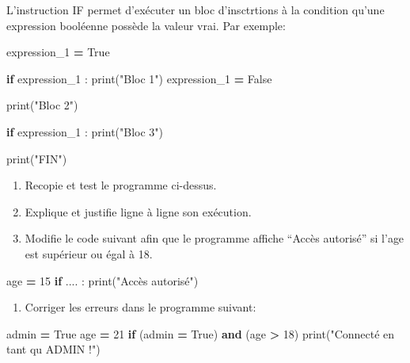 \documentclass[
]{book}
\newenvironment{Shaded}{\begin{snugshade}}{\end{snugshade}}
\newcommand{\BuiltInTok}[1]{#1}
\newcommand{\ControlFlowTok}[1]{\textcolor[rgb]{0.13,0.29,0.53}{\textbf{#1}}}
\newcommand{\DecValTok}[1]{\textcolor[rgb]{0.00,0.00,0.81}{#1}}
\newcommand{\KeywordTok}[1]{\textcolor[rgb]{0.13,0.29,0.53}{\textbf{#1}}}
\newcommand{\NormalTok}[1]{#1}
\newcommand{\OperatorTok}[1]{\textcolor[rgb]{0.81,0.36,0.00}{\textbf{#1}}}
\newcommand{\StringTok}[1]{\textcolor[rgb]{0.31,0.60,0.02}{#1}}
\newcommand{\VariableTok}[1]{\textcolor[rgb]{0.00,0.00,0.00}{#1}}
\providecommand{\tightlist}{%
  \setlength{\itemsep}{0pt}\setlength{\parskip}{0pt}}
\def\tightlist{}
\begin{document}
L'instruction IF permet d'exécuter un bloc d'insctrtions à la condition qu'une expression booléenne possède la valeur vrai. Par exemple:

\begin{Shaded}
\begin{Highlighting}[]
\NormalTok{expression\_1 }\OperatorTok{=} \VariableTok{True}

\ControlFlowTok{if}\NormalTok{ expression\_1 :}
  \BuiltInTok{print}\NormalTok{(}\StringTok{"Bloc 1"}\NormalTok{)}
\NormalTok{  expression\_1 }\OperatorTok{=} \VariableTok{False}

\BuiltInTok{print}\NormalTok{(}\StringTok{"Bloc 2"}\NormalTok{)}

\ControlFlowTok{if}\NormalTok{ expression\_1 :}
  \BuiltInTok{print}\NormalTok{(}\StringTok{"Bloc 3"}\NormalTok{)}

\BuiltInTok{print}\NormalTok{(}\StringTok{"FIN"}\NormalTok{)}
\end{Highlighting}
\end{Shaded}

\begin{enumerate}
\def\labelenumi{\arabic{enumi}.}
\tightlist
\item
  Recopie et test le programme ci-dessus.
\item
  Explique et justifie ligne à ligne son exécution.
\item
  Modifie le code suivant afin que le programme affiche ``Accès autorisé'' si l'age est supérieur ou égal à 18.
\end{enumerate}

\begin{Shaded}
\begin{Highlighting}[]
\NormalTok{age }\OperatorTok{=} \DecValTok{15}
\ControlFlowTok{if}\NormalTok{ .... :}
  \BuiltInTok{print}\NormalTok{(}\StringTok{"Accès autorisé"}\NormalTok{)}
\end{Highlighting}
\end{Shaded}

\begin{enumerate}
\def\labelenumi{\arabic{enumi}.}
\setcounter{enumi}{3}
\tightlist
\item
  Corriger les erreurs dans le programme suivant:
\end{enumerate}

\begin{Shaded}
\begin{Highlighting}[]
\NormalTok{admin }\OperatorTok{=} \VariableTok{True}
\NormalTok{age }\OperatorTok{=} \DecValTok{21}
\ControlFlowTok{if}\NormalTok{ (admin }\OperatorTok{=} \VariableTok{True}\NormalTok{) }\KeywordTok{and}\NormalTok{ (age }\OperatorTok{\textgreater{}} \DecValTok{18}\NormalTok{)}
\BuiltInTok{print}\NormalTok{(}\StringTok{"Connecté en tant qu\textquotesingle{} ADMIN !"}\NormalTok{)}
\end{Highlighting}
\end{Shaded}
\end{document}
